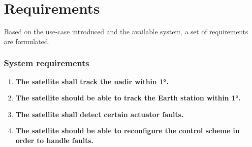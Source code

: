 \chapter{Requirements}\label{chap:requirements}
Based on the use-case introduced and the available system, a set of requirements are formulated.
%
\subsection*{System requirements}
%
\begin{enumerate}
	\item \textbf{The satellite shall track the nadir within 1°.}	
	
	\item \textbf{The satellite should be able to track the Earth station within 1°.}	
	
	\item \textbf{The satellite shall detect certain actuator faults.}
	
	\item \textbf{The satellite should be able to reconfigure the control scheme in order to handle faults.}	
	
\end{enumerate}


